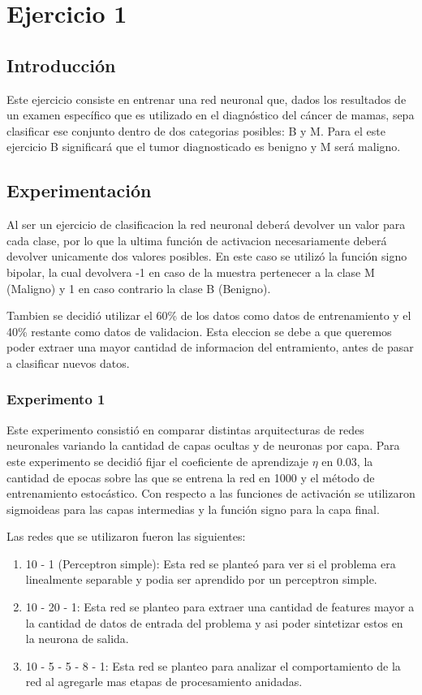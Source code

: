 \section{Ejercicio 1}

\subsection{Introducción}
Este ejercicio consiste en entrenar una red neuronal que, dados los resultados de un examen específico que es utilizado en el diagnóstico del
cáncer de mamas, sepa clasificar ese conjunto dentro de dos categorias posibles: B y M. Para el este ejercicio B significará que el tumor diagnosticado
es benigno y M será maligno.

\subsection{Experimentación}
Al ser un ejercicio de clasificacion la red neuronal deberá devolver un valor para cada clase, por lo que la ultima función de activacion necesariamente
deberá devolver unicamente dos valores posibles. En este caso se utilizó la función signo bipolar, la cual devolvera -1 en caso de la muestra pertenecer
a la clase M (Maligno) y 1 en caso contrario la clase B (Benigno).

Tambien se decidió utilizar el 60\% de los datos como datos de entrenamiento y el 40\% restante como datos de validacion. Esta eleccion se debe a que
queremos poder extraer una mayor cantidad de informacion del entramiento, antes de pasar a clasificar nuevos datos.

\subsubsection{Experimento 1}
Este experimento consistió en comparar distintas arquitecturas de redes neuronales variando la cantidad de capas ocultas y de neuronas por capa.
Para este experimento se decidió fijar el coeficiente de aprendizaje $\eta$ en 0.03, la cantidad de epocas sobre las que se entrena la red en 1000 y el
método de entrenamiento estocástico. Con respecto a las funciones de activación se utilizaron sigmoideas para las capas intermedias y la función signo
para la capa final.

Las redes que se utilizaron fueron las siguientes:
\begin{enumerate}
  \item 10 - 1 (Perceptron simple): Esta red se planteó para ver si el problema era linealmente separable y podia ser aprendido por un perceptron
                                      simple.
  \item 10 - 20 - 1: Esta red se planteo para extraer una cantidad de features mayor a la cantidad de datos de entrada del problema y asi poder sintetizar
                      estos en la neurona de salida.
  \item 10 - 5 - 5 - 8 - 1: Esta red se planteo para analizar el comportamiento de la red al agregarle mas etapas de procesamiento anidadas.
\end{enumerate}

